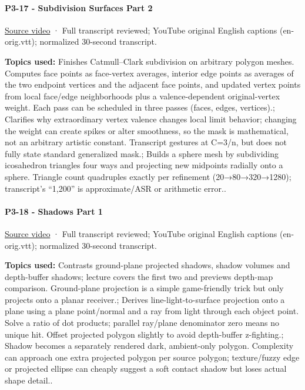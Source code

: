 \paragraph{P3-17 - Subdivision Surfaces Part 2}\label{p3-17---subdivision-surfaces-part-2}

\href{https://www.youtube.com/watch?v=THiF7-QxKXk}{Source video} · Full transcript reviewed; YouTube original English captions (en-orig.vtt); normalized 30-second transcript.

\textbf{Topics used:} Finishes Catmull--Clark subdivision on arbitrary polygon meshes. Computes face points as face-vertex averages, interior edge points as averages of the two endpoint vertices and the adjacent face points, and updated vertex points from local face/edge neighborhoods plus a valence-dependent original-vertex weight. Each pass can be scheduled in three passes (faces, edges, vertices).; Clarifies why extraordinary vertex valence changes local limit behavior; changing the weight can create spikes or alter smoothness, so the mask is mathematical, not an arbitrary artistic constant. Transcript gestures at C=3/n, but does not fully state standard generalized mask.; Builds a sphere mesh by subdividing icosahedron triangles four ways and projecting new midpoints radially onto a sphere. Triangle count quadruples exactly per refinement (20→80→320→1280); transcript's ``1,200'' is approximate/ASR or arithmetic error..

\paragraph{P3-18 - Shadows Part 1}\label{p3-18---shadows-part-1}

\href{https://www.youtube.com/watch?v=kmdRmXuOjIY}{Source video} · Full transcript reviewed; YouTube original English captions (en-orig.vtt); normalized 30-second transcript.

\textbf{Topics used:} Contrasts ground-plane projected shadows, shadow volumes and depth-buffer shadows; lecture covers the first two and previews depth-map comparison. Ground-plane projection is a simple game-friendly trick but only projects onto a planar receiver.; Derives line-light-to-surface projection onto a plane using a plane point/normal and a ray from light through each object point. Solve a ratio of dot products; parallel ray/plane denominator zero means no unique hit. Offset projected polygon slightly to avoid depth-buffer z-fighting.; Shadow becomes a separately rendered dark, ambient-only polygon. Complexity can approach one extra projected polygon per source polygon; texture/fuzzy edge or projected ellipse can cheaply suggest a soft contact shadow but loses actual shape detail..

